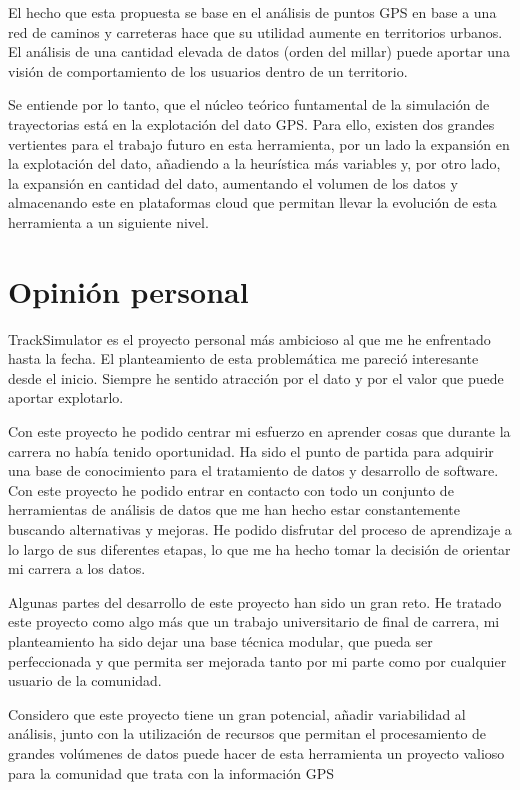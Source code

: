 El hecho que esta propuesta se base en el análisis de puntos \ac{GPS} en base a una red de caminos y carreteras hace que su utilidad aumente en territorios urbanos. El análisis de una cantidad elevada de datos (orden del millar) puede aportar una visión de comportamiento de los usuarios dentro de un territorio.

Se entiende por lo tanto, que el núcleo teórico funtamental de la simulación de trayectorias está en la explotación del dato \ac{GPS}. Para ello, existen dos grandes vertientes para el trabajo futuro en esta herramienta, por un lado la expansión en la explotación del dato, añadiendo a la heurística más variables y, por otro lado, la expansión en cantidad del dato, aumentando el volumen de los datos y almacenando este en plataformas cloud que permitan llevar la evolución de esta herramienta a un siguiente nivel.

\section{Opinión personal}
TrackSimulator es el proyecto personal más ambicioso al que me he enfrentado hasta la 
fecha. El planteamiento de esta problemática me pareció interesante desde el inicio. 
Siempre he sentido atracción por el dato y por el valor que puede aportar explotarlo. 

Con este proyecto he podido centrar mi esfuerzo en aprender cosas que durante la 
carrera no había tenido oportunidad. Ha sido el punto de partida para adquirir una base 
de conocimiento para el tratamiento de datos y desarrollo de software. Con este 
proyecto he podido entrar en contacto con todo un conjunto de herramientas de 
análisis de datos que me han hecho estar constantemente buscando alternativas y 
mejoras. He podido disfrutar del proceso de aprendizaje a lo largo de sus diferentes 
etapas, lo que me ha hecho tomar la decisión de orientar mi carrera a los datos.

Algunas partes del desarrollo de este proyecto han sido un gran reto. He tratado este 
proyecto como algo más que un trabajo universitario de final de carrera, mi 
planteamiento ha sido dejar una base técnica modular, que pueda ser perfeccionada y 
que permita ser mejorada tanto por mi parte como por cualquier usuario de la 
comunidad.

Considero que este proyecto tiene un gran potencial, añadir variabilidad al análisis, 
junto con la utilización de recursos que permitan el procesamiento de grandes 
volúmenes de datos puede hacer de esta herramienta un proyecto valioso para la 
comunidad que trata con la información \ac{GPS}

